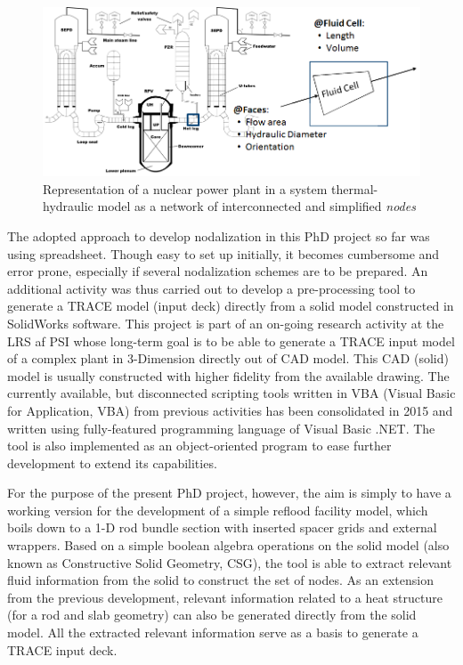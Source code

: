 \documentclass[11pt,titlepage]{article}
\begin{document}
\begin{figure}[h!]
	\centering
	\includegraphics[scale=0.60]{figures/nodalization.png}
	\caption{Representation of a nuclear power plant in a system thermal-hydraulic model as a network of interconnected and simplified \emph{nodes}}
	\label{fig:nodalization}
\end{figure}

The adopted approach to develop nodalization in this PhD project so far was using spreadsheet. 
Though easy to set up initially, it becomes cumbersome and error prone, especially if several nodalization schemes are to be prepared.
An additional activity was thus carried out to develop a pre-processing tool to generate a TRACE model (input deck) directly from a solid model constructed in SolidWorks software.
This project is part of an on-going research activity at the LRS af PSI whose long-term goal is to be able to generate a TRACE input model of a complex plant in 3-Dimension directly out of CAD model.
This CAD (solid) model is usually constructed with higher fidelity from the available drawing.
The currently available, but disconnected scripting tools written in VBA (Visual Basic for Application, VBA) from previous activities has been consolidated in 2015 and 
written using fully-featured programming language of Visual Basic .NET.
The tool is also implemented as an object-oriented program to ease further development to extend its capabilities.

For the purpose of the present PhD project, however, the aim is simply to have a working 
version for the development of a simple reflood facility model, 
which boils down to a 1-D rod bundle section with inserted spacer grids and external wrappers.
Based on a simple boolean algebra operations on the solid model 
(also known as Constructive Solid Geometry, CSG), the tool is able to 
extract relevant fluid information from the solid to construct the set of nodes.
As an extension from the previous development, relevant information related to
a heat structure (for a rod and slab geometry) can also be generated directly 
from the solid model. 
All the extracted relevant information serve as a basis to generate a TRACE input deck. 
\end{document}
